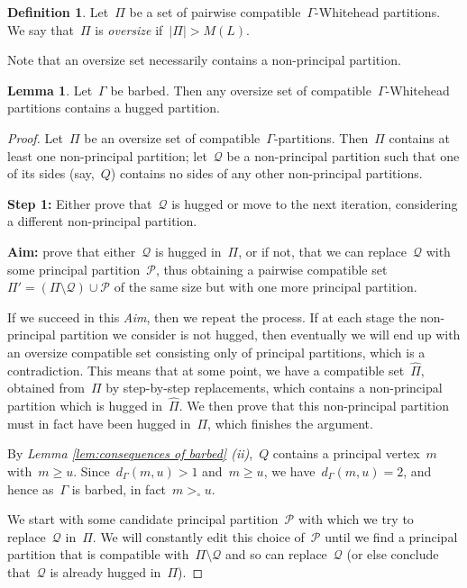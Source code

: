 \documentclass[11pt]{amsart}
\theoremstyle{definition}
\theoremstyle{definition}
\theoremstyle{definition}
\theoremstyle{definition}
\newtheorem{lemma}[theorem]{Lemma}
\newtheorem{definition}[theorem]{Definition}
\newcommand{\calQ}{\mathcal{Q}}
\newcommand{\calP}{\mathcal{P}} %
\begin{document}
\begin{definition}\label{def:oversize}
    Let~$\Pi$ be a set of pairwise compatible~$\Gamma$-Whitehead partitions. We say that~$\Pi$ is \emph{oversize} if~$\vert \Pi \vert > M(L)$.
\end{definition}

Note that an oversize set necessarily contains a non-principal partition. 

\begin{lemma}\label{lem:barbed implies oversize contains hugged}
    Let~$\Gamma$ be barbed. Then any oversize set of compatible~$\Gamma$-Whitehead partitions contains a hugged partition.
\end{lemma}

\begin{proof}
    Let~$\Pi$ be an oversize set of compatible~$\Gamma$-partitions. Then~$\Pi$ contains at least one non-principal partition; let~$\calQ$ be a non-principal partition such that one of its sides (say,~$Q$) contains no sides of any other non-principal partitions. 

    \textbf{Step 1:} Either prove that~$\calQ$ is hugged or move to the next iteration, considering a different non-principal partition.
    
    \textbf{Aim:} prove that either~$\calQ$ is hugged in~$\Pi$, or if not, that we can replace~$\calQ$ with some principal partition~$\calP$, thus obtaining a pairwise compatible set~$\Pi' = \left( \Pi \setminus \calQ \right) \cup \calP$ of the same size but with one more principal partition.

    If we succeed in this \emph{Aim}, then we repeat the process. If at each stage the non-principal partition we consider is not hugged, then eventually we will end up with an oversize compatible set consisting only of principal partitions, which is a contradiction. This means that at some point, we have a compatible set~$\widehat{\Pi}$, obtained from~$\Pi$ by step-by-step replacements, which contains a non-principal partition which is hugged in~$\widehat{\Pi}$. We then prove that this non-principal partition must in fact have been hugged in~$\Pi$, which finishes the argument.

    By \textit{Lemma \ref{lem:consequences of barbed} (ii)},~$Q$ contains a principal vertex~$m$ with~$m \geq u$. Since~$d_\Gamma(m, u) > 1$ and~$m \geq u$, we have~$d_\Gamma(m, u) = 2$, and hence as~$\Gamma$ is barbed, in fact~$m >_\circ u$. 

    We start with some candidate principal partition~$\calP$ with which we try to replace~$\calQ$ in~$\Pi$. We will constantly edit this choice of~$\calP$ until we find a principal partition that is compatible with~$\Pi \setminus \calQ$ and so can replace~$\calQ$ (or else conclude that~$\calQ$ is already hugged in~$\Pi$). 
    

\end{proof}
\end{document}
